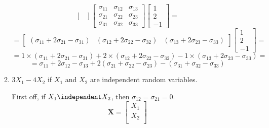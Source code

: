 \begin{enumerate}[font=\bfseries]
\begin{enumerate}
\[\begin{bmatrix}
                \end{bmatrix}
                \begin{bmatrix}
                    \sigma_{11} & \sigma_{12} & \sigma_{13} \\
                    \sigma_{21} & \sigma_{22} & \sigma_{23} \\
                    \sigma_{31} & \sigma_{32} & \sigma_{33}
                \end{bmatrix}
                \begin{bmatrix}
                    1 \\
                    2 \\
                    -1
                \end{bmatrix}
                =
            \]
            \[
                =
                \begin{bmatrix}
                    \left(\sigma_{11} + 2\sigma_{21} - \sigma_{31}\right) &
                    \left(\sigma_{12} + 2\sigma_{22} - \sigma_{32}\right) &
                    \left(\sigma_{13} + 2\sigma_{23} - \sigma_{33}\right)
                \end{bmatrix}
                \begin{bmatrix}
                    1 \\
                    2 \\
                    -1
                \end{bmatrix}
                =
            \]
            \[
                =
                1 \times \left(\sigma_{11} + 2\sigma_{21} - \sigma_{31}\right) + 2 \times \left(\sigma_{12} + 2\sigma_{22} - \sigma_{32}\right)
                    - 1 \times \left(\sigma_{13} + 2\sigma_{23} - \sigma_{33}\right)
                =
            \]
            \[
                =
                \sigma_{11} + 2 \sigma_{12} - \sigma_{13}
                +2(\sigma_{21} + \sigma_{22} - \sigma_{23})
                -(\sigma_{31} + \sigma_{32} - \sigma_{33})
            \]
            \item $3X_1 - 4X_2$ if $X_1$ and $X_2$ are independent random variables.
            \newline
            \par
            First off, if $X_1 \independent X_2$, then $\sigma_{12} = \sigma_{21} = 0$.
            \[
                \textbf{X}
                =
                \begin{bmatrix}
                    X_1 \\
                    X_2 \\

\end{bmatrix}\]
\end{enumerate}
\end{enumerate}
